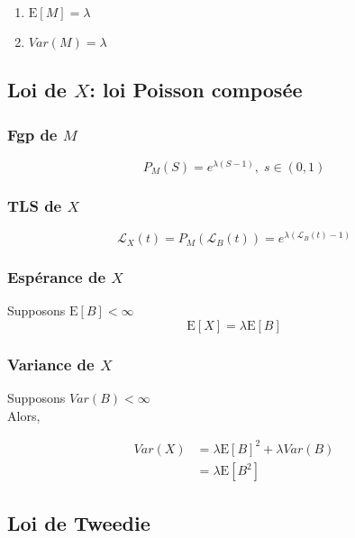 \documentclass[]{book}
\theoremstyle{definition}
\theoremstyle{definition}
\theoremstyle{definition}
\theoremstyle{remark}
\begin{document}
\begin{enumerate}
\item $\text{E}[M]=\lambda$
\item $Var(M)=\lambda$
\end{enumerate}

\subsection{\texorpdfstring{Loi de \(X\): loi Poisson
composée}{Loi de X: loi Poisson composée}}\label{loi-de-x-loi-poisson-composee}

\subsubsection{\texorpdfstring{Fgp de
\(M\)}{Fgp de M}}\label{fgp-de-m-1}

\[P_M(S)=e^{\lambda(S-1)},\;s \in (0,1)\]

\subsubsection{\texorpdfstring{TLS de
\(X\)}{TLS de X}}\label{tls-de-x-2}

\[\mathcal{L}_X(t)=P_M\left (\mathcal{L}_B(t)\right )= e^{\lambda\left (\mathcal{L}_B(t)-1\right )}\]

\subsubsection{\texorpdfstring{Espérance de
\(X\)}{Espérance de X}}\label{esperance-de-x-2}

Supposons \(\text{E}[B]<\infty\) \[
\text{E}[X]=\lambda\text{E}[B]
\]

\subsubsection{\texorpdfstring{Variance de
\(X\)}{Variance de X}}\label{variance-de-x-2}

Supposons \(Var(B)<\infty\)\\
Alors,

\begin{align*}
Var(X) &= \lambda\text{E}[B]^2+\lambda Var(B)\\
& =\lambda\text{E}[B^2]
\end{align*}

\subsection{Loi de Tweedie}\label{loi-de-tweedie}
\end{document}
